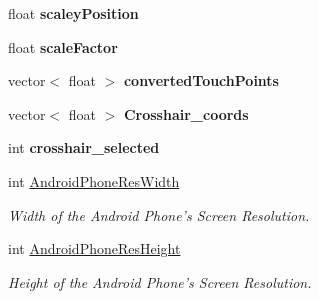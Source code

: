 \begin{DoxyCompactItemize}
\item 
\hypertarget{classtest_app_a9e86476934494e86dd955d5888333795}{float {\bfseries scaley\-Position}}\label{classtest_app_a9e86476934494e86dd955d5888333795}

\item 
\hypertarget{classtest_app_a862943de1cd06690befd3740f6711762}{float {\bfseries scale\-Factor}}\label{classtest_app_a862943de1cd06690befd3740f6711762}

\item 
\hypertarget{classtest_app_a4764bd1bead24898cc3858707ee14ed9}{vector$<$ float $>$ {\bfseries converted\-Touch\-Points}}\label{classtest_app_a4764bd1bead24898cc3858707ee14ed9}

\item 
\hypertarget{classtest_app_a0d9a8da39f01ebe05efbaef7dc2744ea}{vector$<$ float $>$ {\bfseries Crosshair\-\_\-coords}}\label{classtest_app_a0d9a8da39f01ebe05efbaef7dc2744ea}

\item 
\hypertarget{classtest_app_abd2b58403a31a721e2201c3012d3b4e3}{int {\bfseries crosshair\-\_\-selected}}\label{classtest_app_abd2b58403a31a721e2201c3012d3b4e3}

\item 
\hypertarget{classtest_app_a4930c7e7ecb7783261349fd2f2e22f8b}{int \hyperlink{classtest_app_a4930c7e7ecb7783261349fd2f2e22f8b}{Android\-Phone\-Res\-Width}}\label{classtest_app_a4930c7e7ecb7783261349fd2f2e22f8b}

\begin{DoxyCompactList}\small\item\em Width of the Android Phone's Screen Resolution. \end{DoxyCompactList}\item 
\hypertarget{classtest_app_a9389fab48c7bd5896f26d494fa238535}{int \hyperlink{classtest_app_a9389fab48c7bd5896f26d494fa238535}{Android\-Phone\-Res\-Height}}\label{classtest_app_a9389fab48c7bd5896f26d494fa238535}

\begin{DoxyCompactList}\small\item\em Height of the Android Phone's Screen Resolution. \end{DoxyCompactList}\end{DoxyCompactItemize}
